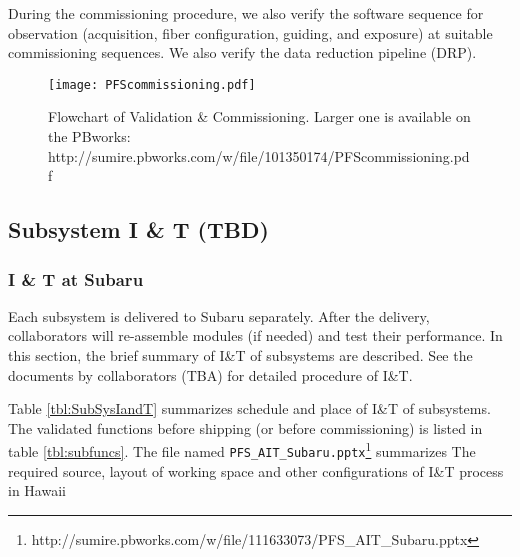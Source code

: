 During the commissioning procedure, we also verify the software sequence for observation (acquisition, fiber configuration, guiding, and exposure) at suitable commissioning sequences.
We also verify the data reduction pipeline (DRP).

\begin{landscape}
\begin{figure}[!ht]
\begin{center}
\vspace*{0mm}
\hspace*{-10mm}
\texttt{[image: PFScommissioning.pdf]}
\end{center}
\vspace*{-8mm}
\caption{Flowchart of Validation \& Commissioning. Larger one is available on the PBworks: \newline
http://sumire.pbworks.com/w/file/101350174/PFScommissioning.pdf
}
\label{fig:flowchart}
\end{figure}
\end{landscape}

\subsection{Subsystem I \& T (TBD)}
\subsubsection{I \& T at Subaru}
Each subsystem is delivered to Subaru separately.
After the delivery, collaborators will re-assemble modules (if needed) and test their performance.
In this section, the brief summary of I\&T of subsystems are described.
See the documents by collaborators (TBA) for detailed procedure of I\&T.

Table \ref{tbl:SubSysIandT} summarizes schedule and place of I\&T of subsystems.
The validated functions before shipping (or before commissioning) is listed in table \ref{tbl:subfuncs}.
The file named {\tt PFS\_AIT\_Subaru.pptx}\footnote{http://sumire.pbworks.com/w/file/111633073/PFS\_AIT\_Subaru.pptx} summarizes The required source, layout of working space and other configurations of I\&T process in Hawaii

